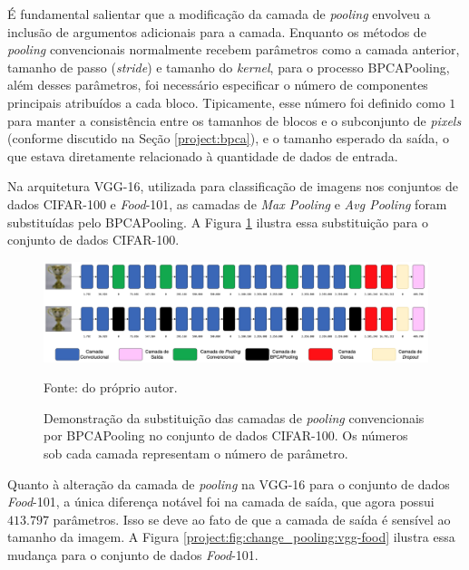 É fundamental salientar que a modificação da camada de \textit{pooling} envolveu a inclusão de argumentos adicionais para a camada. Enquanto os métodos de \textit{pooling} convencionais normalmente recebem parâmetros como a camada anterior, tamanho de passo (\textit{stride}) e tamanho do \textit{kernel}, para o processo BPCAPooling, além desses parâmetros, foi necessário especificar o número de componentes principais atribuídos a cada bloco. Tipicamente, esse número foi definido como $1$ para manter a consistência entre os tamanhos de blocos e o subconjunto de \textit{pixels} (conforme discutido na Seção \ref{project:bpca}), e o tamanho esperado da saída, o que estava diretamente relacionado à quantidade de dados de entrada.

Na arquitetura VGG-16, utilizada para classificação de imagens nos conjuntos de dados CIFAR-100 e \textit{Food}-101, as camadas de \textit{Max Pooling} e \textit{Avg Pooling} foram substituídas pelo BPCAPooling. A Figura \ref{project:fig:change_pooling:vgg-cifar} ilustra essa substituição para o conjunto de dados CIFAR-100.

\begin{figure}[H]
    \centering
    \caption{Demonstração da substituição das camadas de \textit{pooling} convencionais por BPCAPooling no conjunto de dados CIFAR-100. Os números sob cada camada representam o número de parâmetro.}
    \includegraphics[width=1\textwidth]{recursos/imagens/project/vgg-with-bpca-cifar.png}
    \label{project:fig:change_pooling:vgg-cifar}

    Fonte: do próprio autor.
\end{figure}

Quanto à alteração da camada de \textit{pooling} na VGG-16 para o conjunto de dados \textit{Food}-101, a única diferença notável foi na camada de saída, que agora possui $413.797$ parâmetros. Isso se deve ao fato de que a camada de saída é sensível ao tamanho da imagem. A Figura \ref{project:fig:change_pooling:vgg-food} ilustra essa mudança para o conjunto de dados \textit{Food}-101.

